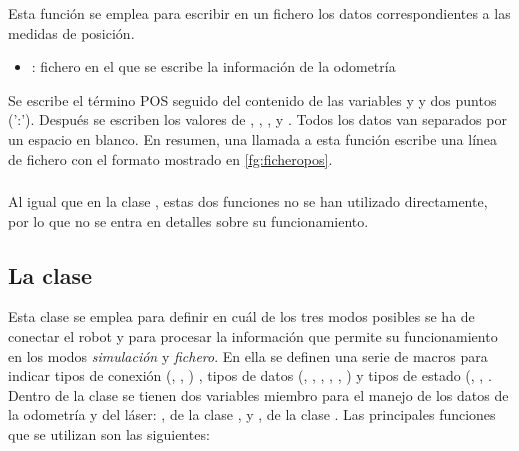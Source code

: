 
\noindent
Esta función se emplea para escribir en un fichero los datos correspondientes a las medidas de posición.

\begin{itemize}
  \item {}: fichero en el que se escribe la información de la odometría
\end{itemize}

\noindent
Se escribe el término POS seguido del contenido de las variables  y  y dos puntos (':'). Después se escriben los valores de , , ,  y . Todos los datos van separados por un espacio en blanco. En resumen, una llamada a esta función escribe una línea de fichero con el formato mostrado en \ref{fg:ficheropos}.

\subsubsection {}
\subsubsection {}

\vspace{0.2cm}
\noindent
Al igual que en la clase , estas dos funciones no se han utilizado directamente, por lo que no se entra en detalles sobre su funcionamiento.

\subsection{La clase }
Esta clase se emplea para definir en cuál de los tres modos posibles se ha de conectar el robot y para procesar la información que permite su funcionamiento en los modos \emph{simulación} y \emph{fichero}. En ella se definen una serie de macros para indicar tipos de conexión (, , ) , tipos de datos (, , , , , ) y tipos de estado (, , . Dentro de la clase se tienen dos variables miembro para el manejo de los datos de la odometría y del láser: , de la clase , y , de la clase . Las principales funciones que se utilizan son las siguientes:

